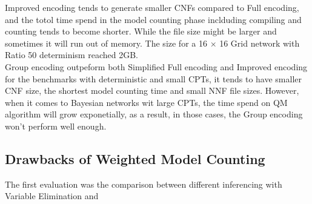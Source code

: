 Improved encoding tends to generate smaller CNFs compared to Full encoding, and the totol time spend in the model counting phase inclduding compiling and counting tends to become shorter. While the file size might be larger and sometimes it will run out of memory. The size for a 16 $\times$ 16 Grid network with Ratio 50 determinism reached 2GB.\\

Group encoding outpeform both Simplified Full encoding and Improved encoding for the benchmarks with deterministic and small CPTs, it tends to have smaller CNF size, the shortest model counting time and small NNF file sizes. However, when it comes to Bayesian networks wit large CPTs, the time spend on QM algorithm will grow exponetially, as a result, in those cases, the Group encoding won't perform well enough.

\subsection{Drawbacks of Weighted Model Counting}
The first evaluation was the comparison between different inferencing with Variable Elimination and 

